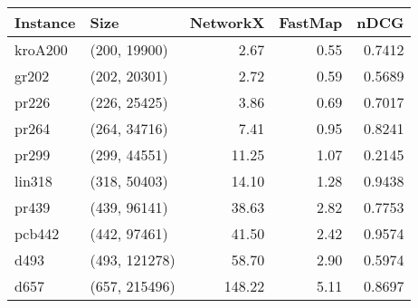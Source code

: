 \begin{tabular}{llrrr}
\toprule
Instance &          Size &  NetworkX &  FastMap &   nDCG \\
\midrule
 kroA200 &  (200, 19900) &      2.67 &     0.55 & 0.7412 \\
   gr202 &  (202, 20301) &      2.72 &     0.59 & 0.5689 \\
   pr226 &  (226, 25425) &      3.86 &     0.69 & 0.7017 \\
   pr264 &  (264, 34716) &      7.41 &     0.95 & 0.8241 \\
   pr299 &  (299, 44551) &     11.25 &     1.07 & 0.2145 \\
  lin318 &  (318, 50403) &     14.10 &     1.28 & 0.9438 \\
   pr439 &  (439, 96141) &     38.63 &     2.82 & 0.7753 \\
  pcb442 &  (442, 97461) &     41.50 &     2.42 & 0.9574 \\
    d493 & (493, 121278) &     58.70 &     2.90 & 0.5974 \\
    d657 & (657, 215496) &    148.22 &     5.11 & 0.8697 \\
\bottomrule
\end{tabular}
